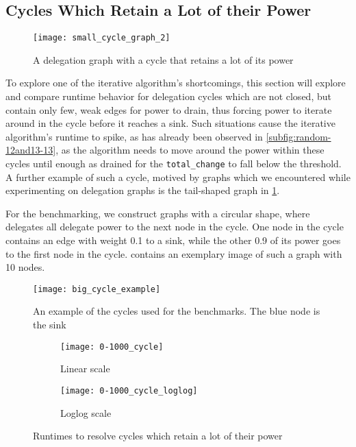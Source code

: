 \subsection{Cycles Which Retain a Lot of their Power}
\label{subsec:cycles_draining}

\begin{figure}
\centering
\texttt{[image: small\_cycle\_graph\_2]}
\caption{A delegation graph with a cycle that retains a lot of its power}
\label{fig:cycle_example}
\end{figure}

To explore one of the iterative algorithm's shortcomings, this section will explore and compare runtime behavior for delegation cycles which are not closed, but contain only few, weak edges for power to drain, thus forcing power to iterate around in the cycle before it reaches a sink. Such situations cause the iterative algorithm's runtime to spike, as has already been observed in \cref{subfig:random-12and13-13}, as the algorithm needs to move around the power within these cycles until enough as drained for the \texttt{total\_change} to fall below the threshold. A further example of such a cycle, motived by graphs which we encountered while experimenting on delegation graphs is the tail-shaped graph in \cref{fig:cycle_example}. 

For the benchmarking, we construct graphs with a circular shape, where delegates all delegate power to the next node in the cycle. One node in the cycle contains an edge with weight 0.1 to a sink, while the other 0.9 of its power goes to the first node in the cycle.  contains an exemplary image of such a graph with 10 nodes. 

\begin{figure}[t]
	\centering
	\texttt{[image: big\_cycle\_example]}
	\caption{An example of the cycles used for the benchmarks. The blue node is the sink}
	\label{fig:big_cycle_example}
\end{figure}

\begin{figure}[t]
    \centering
    \begin{subfigure}[t]{0.45\textwidth}
    	\centering
    	\texttt{[image: 0-1000\_cycle]}
    	\caption{Linear scale}
    	\label{subfig:cycle-small-linear}
    \end{subfigure}
    \hfill
    \begin{subfigure}[t]{0.45\textwidth}
        \centering
        \texttt{[image: 0-1000\_cycle\_loglog]}
        \caption{Loglog scale}
         \label{subfig:cycle-small-loglog}
    \end{subfigure}
    \caption{Runtimes to resolve cycles which retain a lot of their power}
    \label{fig:cycle_small}
\end{figure}

